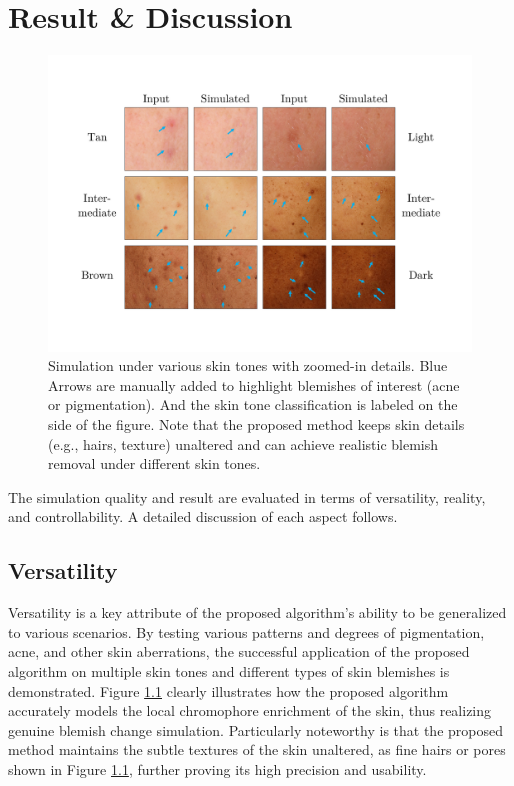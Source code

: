 
\chapter{Result \& Discussion}
\begin{spacing}{1.5}
\setlength{\parskip}{0.3in}
\begin{figure}[h]
    \centering
    \includegraphics[width=\columnwidth]{Chapter5/img_comp6.pdf}
    \caption{Simulation under various skin tones with zoomed-in details. Blue Arrows are manually added to highlight blemishes of interest (acne or pigmentation). And the skin tone classification is labeled on the side of the figure. Note that the proposed method keeps skin details (e.g., hairs, texture) unaltered and can achieve realistic blemish removal under different skin tones.}
    \label{fig:sim1}
\end{figure}
The simulation quality and result are evaluated in terms of versatility, reality, and controllability. A detailed discussion of each aspect follows.
\section{Versatility}
Versatility is a key attribute of the proposed algorithm's ability to be generalized to various scenarios. By testing various patterns and degrees of pigmentation, acne, and other skin aberrations, the successful application of the proposed algorithm on multiple skin tones and different types of skin blemishes is demonstrated. Figure \ref{fig:sim1} clearly illustrates how the proposed algorithm accurately models the local chromophore enrichment of the skin, thus realizing genuine blemish change simulation. Particularly noteworthy is that the proposed method maintains the subtle textures of the skin unaltered, as fine hairs or pores shown in Figure \ref{fig:sim1}, further proving its high precision and usability.


\end{spacing}
